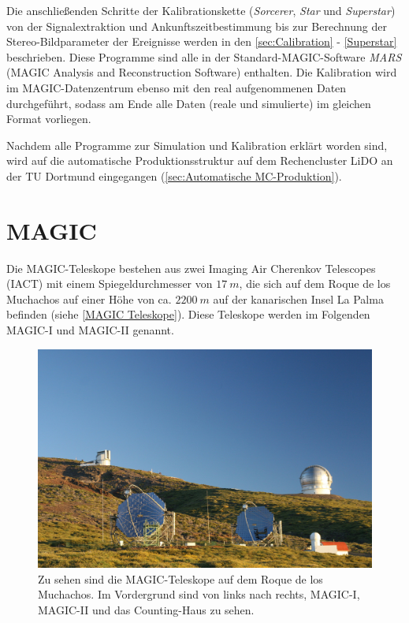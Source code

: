 Die anschließenden Schritte der Kalibrationskette (\textit{Sorcerer}, \textit{Star} und \textit{Superstar}) von der Signalextraktion und Ankunftszeitbestimmung bis zur Berechnung der Stereo-Bildparameter der Ereignisse werden in den \autoref{sec:Calibration} - \autoref{Superstar} beschrieben.
Diese Programme sind alle in der Standard-MAGIC-Software \textit{MARS} (MAGIC Analysis and Reconstruction Software)\cite{MARS} enthalten.
Die Kalibration wird im MAGIC-Datenzentrum ebenso mit den real aufgenommenen Daten durchgeführt, sodass am Ende alle Daten (reale und simulierte) im gleichen Format vorliegen.

Nachdem alle Programme zur Simulation und Kalibration erklärt worden sind, wird auf die automatische Produktionsstruktur auf dem Rechencluster LiDO an der TU Dortmund eingegangen (\autoref{sec:Automatische MC-Produktion}).



\section{MAGIC}
\label{sec:MAGIC}

Die MAGIC-Teleskope bestehen aus zwei Imaging Air Cherenkov Telescopes (IACT) mit einem Spiegeldurchmesser von $\SI{17}{m}$, die sich auf dem Roque de los Muchachos auf einer Höhe von ca. $\SI{2200}{m}$ auf der kanarischen Insel La Palma befinden (siehe \autoref{MAGIC Teleskope}).
Diese Teleskope werden im Folgenden MAGIC-I und MAGIC-II genannt.

\begin{figure}
    \centering
    \includegraphics[width=\textwidth]{./Plots/03_MonteCarlos/MAGIC-Telescopes.jpg}
    \caption{Zu sehen sind die MAGIC-Teleskope auf dem Roque de los Muchachos. Im Vordergrund sind von links nach rechts, MAGIC-I, MAGIC-II und das Counting-Haus zu sehen.\cite{MAGIC-Homepage}}
    \label{MAGIC Teleskope}
\end{figure}

